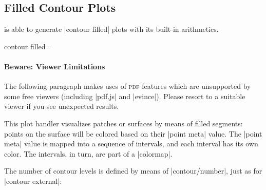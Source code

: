 {{}


\subsection{Filled Contour Plots}
\label{sec:pgfplots:filled:contour}

{
\PGFPlots{} is able to generate |contour filled| plots with its built-in
arithmetics.

\begin{plottype}[/pgfplots]{
    contour filled=\textcolor{black}{}%
}
    \paragraph{Beware: Viewer Limitations}

    The following paragraph makes uses of \textsc{pdf} features which are
    unsupported by some free viewers (including |pdf.js| and |evince|). Please
    resort to a suitable viewer if you see unexpected results.

    This plot handler visualizes patches or surfaces by means of filled
    segments: points on the surface will be colored based on their |point meta|
    value. The |point meta| value is mapped into a sequence of intervals, and
    each interval has its own color. The intervals, in turn, are part of a
    |colormap|.
\pgfplotsexpensiveexample
\begin{codeexample}[]
\end{codeexample}
    The number of contour levels is defined by means of |contour/number|, just
    as for |contour external|:

\pgfplotsexpensiveexample
\begin{codeexample}[]
\end{codeexample}


\end{plottype}}}
